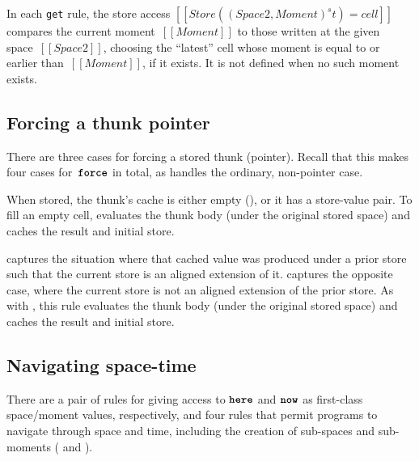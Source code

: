 \documentclass[11pt]{article}
\renewcommand{\ottkw}[1]{\textbf{\texttt{#1}}}
\begin{document}
\noindent
In each \texttt{get} rule, the store access $[[Store((Space2, Moment) ^ st) = cell]]$ compares the current moment~$[[Moment]]$ to those written at the given space~$[[Space2]]$, choosing the ``latest'' cell whose moment is equal to or earlier than~$[[Moment]]$, if it exists.
It is not defined when no such moment exists.

\subsection{Forcing a thunk pointer}

There are three cases for forcing a stored thunk (pointer).
%
Recall that this makes four cases for~$\ottkw{force}$ in total,
as  handles the ordinary, non-pointer case.

\begin{mathpar}
\end{mathpar}

When stored, the thunk's cache is either empty (),
or it has a store-value pair.
%
To fill an empty cell,  evaluates the thunk body (under
the original stored space) and caches the result and initial store.

 captures the situation where that cached value was produced
under a prior store such that the current store is an aligned extension of it.
%
 captures the opposite case, where the current store is not an aligned extension of the prior store.
%
As with , this rule evaluates the thunk body (under
the original stored space) and caches the result and initial store.

\subsection{Navigating space-time}
\label{sec:refsem-navigation}

There are a pair of rules for giving access to $\ottkw{here}$ and $\ottkw{now}$
as first-class space/moment values, respectively,
and four rules that permit programs to navigate through space and time,
including the creation of sub-spaces and sub-moments ( and ).
\end{document}
